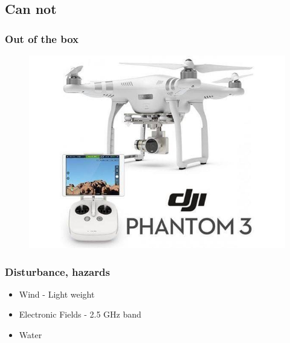 \subsection{Can not}

\begin{frame}
\frametitle{Out of the box}

  \begin{figure}
  \includegraphics[scale=0.5]{pic/03_our-copter/phantom3.jpg}
  \end{figure}
  
\end{frame}



\begin{frame}
\frametitle{Disturbance, hazards}

  \begin{itemize}
    \item Wind - Light weight
    \item Electronic Fields - 2.5 GHz band
	\item Water
  \end{itemize}
    
\end{frame}



